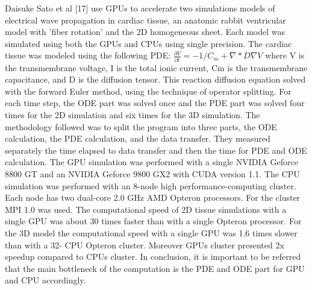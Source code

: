 Daisuke Sato et al [17] use GPUs to accelerate two simulations models of electrical wave propagation in cardiac tissue, an anatomic rabbit ventricular model with 'fiber rotation' and the 2D homogeneous sheet. Each model was simulated using both the GPUs and CPUs using single precision. The cardiac tissue was modeled using the following PDE: 
$\frac{\partial V}{\partial t} = - 1/C_m  +\nabla * D \nabla V$ where V is the transmembrane voltage, I is the total ionic current, Cm is the transmembrane capacitance, and D is the diffusion tensor. This reaction diffusion equation solved with the forward Euler method, using the technique of operator splitting. For each time step, the ODE part was solved once and the PDE part was solved four times for the 2D simulation and six times for the 3D simulation. The methodology followed was to split the program into three parts, the ODE calculation, the PDE calculation, and the data transfer. They measured separately the time elapsed to data transfer and then the time for PDE and ODE calculation. The GPU simulation was performed with a single NVIDIA Geforce 8800 GT and an NVIDIA Geforce 9800 GX2 with CUDA version 1.1. The CPU simulation was performed with an 8-node high performance-computing cluster. Each node has two dual-core 2.0 GHz AMD Opteron processors. For the cluster MPI 1.0 was used. The computational speed of 2D tissue simulations with a single GPU was about 30 times faster than with a single Opteron processor. For the 3D model the computational speed with a single GPU was 1.6 times slower than with a 32- CPU Opteron cluster. Moreover GPUs cluster presented 2x speedup compared to CPUs cluster. In conclusion, it is important to be referred that the main bottleneck of the computation is the PDE and ODE part for GPU and CPU accordingly.

